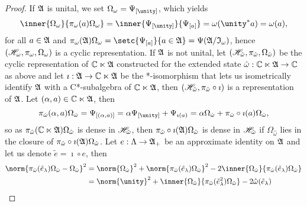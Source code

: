 \begin{proof}
    If \(\mathfrak{A}\) is unital, we set \(\Omega_\omega = \Psi_{[\unity]}\), which yields
    \begin{equation*}
        \inner{\Omega_\omega}{\pi_\omega(a)\Omega_\omega} = \inner{\Psi_{[\unity]}}{\Psi_{[a]}} = \omega(\unity^*a) = \omega(a),
    \end{equation*}
    for all \(a \in \mathfrak{A}\) and \(\pi_\omega(\algebra{A})\Omega_\omega = \setc{\Psi_{[a]}}{a \in \algebra{A}} = \Psi(\algebra{A}/\algebra{I}_\omega)\), hence \((\mathscr{H}_\omega, \pi_\omega, \Omega_\omega)\) is a cyclic representation. If \(\mathfrak{A}\) is not unital, let \((\mathscr{H}_{\hat{\omega}},\pi_{\hat{\omega}}, \Omega_{\hat{\omega}})\) be the cyclic representation of \(\mathbb{C} \ltimes \mathfrak{A}\) constructed for the extended state \(\hat{\omega} : \mathbb{C} \ltimes \mathfrak{A} \to \mathbb{C}\) as above and let \(\imath : \mathfrak{A} \to \mathbb{C} \ltimes \mathfrak{A}\) be the *-isomorphism that lets us isometrically identify \(\mathfrak{A}\) with a C*-subalgebra of \(\mathbb{C} \ltimes \mathfrak{A}\), then \((\mathscr{H}_{\hat{\omega}}, \pi_{\hat{\omega}} \circ \imath)\) is a representation of \(\mathfrak{A}\). Let \((\alpha, a) \in \mathbb{C} \ltimes \mathfrak{A}\), then
    \begin{equation*}
        \pi_{\hat{\omega}}(\alpha,a)\Omega_{\hat{\omega}} = \Psi_{[(\alpha,a)]} = \alpha \Psi_{[\unity]} + \Psi_{\imath(a)} = \alpha \Omega_{\hat{\omega}} + \pi_{\hat{\omega}}\circ \imath(a) \Omega_{\hat{\omega}},
    \end{equation*}
    so as \(\pi_{\hat{\omega}}(\mathbb{C}\ltimes\mathfrak{A})\Omega_{\hat{\omega}}\) is dense in \(\mathscr{H}_{\hat{\omega}}\), then \(\pi_{\hat{\omega}}\circ\imath(\mathfrak{A}) \Omega_{\hat{\omega}}\) is dense in \(\mathscr{H}_{\hat{\omega}}\) if \(\Omega_{\hat{\omega}}\) lies in the closure of \(\pi_{\hat{\omega}}\circ \imath(\mathfrak{A}) \Omega_{\hat{\omega}}\). Let \(e : \Lambda \to \mathfrak{A}_+\) be an approximate identity on \(\mathfrak{A}\) and let us denote \(\tilde{e} = \imath \circ e\), then
    \begin{align*}
        \norm{\pi_{\hat{\omega}}(\tilde{e}_{\lambda})\Omega_{\hat{\omega}} - \Omega_{\hat{\omega}}}^2 
        &= \norm{\Omega_{\hat{\omega}}}^2 + \norm{\pi_{\hat{\omega}}(\tilde{e}_{\lambda})\Omega_{\hat{\omega}}}^2 - 2 \inner{\Omega_{\hat{\omega}}}{\pi_{\hat{\omega}}(\tilde{e}_{\lambda})\Omega_{\hat{\omega}}}\\
        &= \norm{\unity}^2 + \inner{\Omega_{\hat{\omega}}}{\pi_{\hat{\omega}}(\tilde{e}_\lambda^2)\Omega_{\hat{\omega}}} - 2 \hat{\omega}(\tilde{e}_\lambda)\\

\end{align*}
\end{proof}
